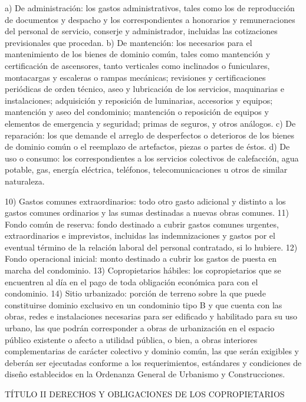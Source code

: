     a) De administración: los gastos administrativos, tales como los de reproducción de documentos y despacho y los correspondientes a honorarios y remuneraciones del personal de servicio, conserje y administrador, incluidas las cotizaciones previsionales que procedan.
    b) De mantención: los necesarios para el mantenimiento de los bienes de dominio común, tales como mantención y certificación de ascensores, tanto verticales como inclinados o funiculares, montacargas y escaleras o rampas mecánicas; revisiones y certificaciones periódicas de orden técnico, aseo y lubricación de los servicios, maquinarias e instalaciones; adquisición y reposición de luminarias, accesorios y equipos; mantención y aseo del condominio; mantención o reposición de equipos y elementos de emergencia y seguridad; primas de seguros, y otros análogos.
    c) De reparación: los que demande el arreglo de desperfectos o deterioros de los bienes de dominio común o el reemplazo de artefactos, piezas o partes de éstos.
    d) De uso o consumo: los correspondientes a los servicios colectivos de calefacción, agua potable, gas, energía eléctrica, teléfonos, telecomunicaciones u otros de similar naturaleza.
     
    10) Gastos comunes extraordinarios: todo otro gasto adicional y distinto a los gastos comunes ordinarios y las sumas destinadas a nuevas obras comunes.
    11) Fondo común de reserva: fondo destinado a cubrir gastos comunes urgentes, extraordinarios e imprevistos, incluidas las indemnizaciones y gastos por el eventual término de la relación laboral del personal contratado, si lo hubiere.
    12) Fondo operacional inicial: monto destinado a cubrir los gastos de puesta en marcha del condominio.
    13) Copropietarios hábiles: los copropietarios que se encuentren al día en el pago de toda obligación económica para con el condominio.
    14) Sitio urbanizado: porción de terreno sobre la que puede constituirse dominio exclusivo en un condominio tipo B y que cuenta con las obras, redes e instalaciones necesarias para ser edificado y habilitado para su uso urbano, las que podrán corresponder a obras de urbanización en el espacio público existente o afecto a utilidad pública, o bien, a obras interiores complementarias de carácter colectivo y dominio común, las que serán exigibles y deberán ser ejecutadas conforme a los requerimientos, estándares y condiciones de diseño establecidos en la Ordenanza General de Urbanismo y Construcciones.

    TÍTULO II
    DERECHOS Y OBLIGACIONES DE LOS COPROPIETARIOS
     


